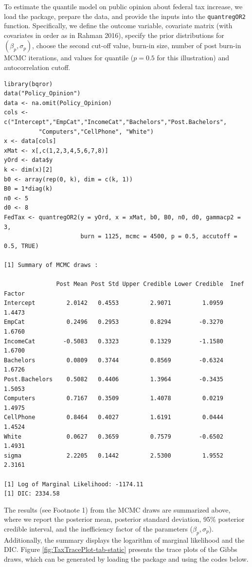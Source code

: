 To estimate the quantile model on public opinion about federal tax increase, we load the  package, prepare the data, and provide the inputs into the \texttt{quantregOR2} function. Specifically, we define the outcome variable, covariate matrix (with covariates in order as in Rahman 2016), specify the prior distributions for \((\beta_{p}, \sigma_{p})\), choose the second cut-off value, burn-in size, number of post burn-in MCMC iterations, and values for quantile (\(p=0.5\) for this illustration) and autocorrelation cutoff.

\begin{verbatim}
library(bqror)
data("Policy_Opinion")
data <- na.omit(Policy_Opinion)
cols <- c("Intercept","EmpCat","IncomeCat","Bachelors","Post.Bachelors",
          "Computers","CellPhone", "White")
x <- data[cols]
xMat <- x[,c(1,2,3,4,5,6,7,8)]
yOrd <- data$y
k <- dim(x)[2]
b0 <- array(rep(0, k), dim = c(k, 1))
B0 = 1*diag(k)
n0 <- 5
d0 <- 8
FedTax <- quantregOR2(y = yOrd, x = xMat, b0, B0, n0, d0, gammacp2 = 3,
                      burn = 1125, mcmc = 4500, p = 0.5, accutoff = 0.5, TRUE)

[1] Summary of MCMC draws :

               Post Mean Post Std Upper Credible Lower Credible  Inef Factor
Intercept         2.0142   0.4553         2.9071         1.0959       1.4473
EmpCat            0.2496   0.2953         0.8294        -0.3270       1.6760
IncomeCat        -0.5083   0.3323         0.1329        -1.1580       1.6700
Bachelors         0.0809   0.3744         0.8569        -0.6324       1.6726
Post.Bachelors    0.5082   0.4406         1.3964        -0.3435       1.5053
Computers         0.7167   0.3509         1.4078         0.0219       1.4975
CellPhone         0.8464   0.4027         1.6191         0.0444       1.4524
White             0.0627   0.3659         0.7579        -0.6502       1.4931
sigma             2.2205   0.1442         2.5300         1.9552       2.3161

[1] Log of Marginal Likelihood: -1174.11
[1] DIC: 2334.58
\end{verbatim}

The results (see Footnote 1) from the MCMC draws are summarized above, where we report the posterior mean, posterior standard deviation, 95\% posterior credible interval, and the inefficiency factor of the parameters (\(\beta_{p}, \sigma_{p}\)). Additionally, the summary displays the logarithm of marginal likelihood and the DIC. Figure \ref{fig:TaxTracePlot-tab-static} presents the trace plots of the Gibbs draws, which can be generated by loading the  package and using the codes below.

